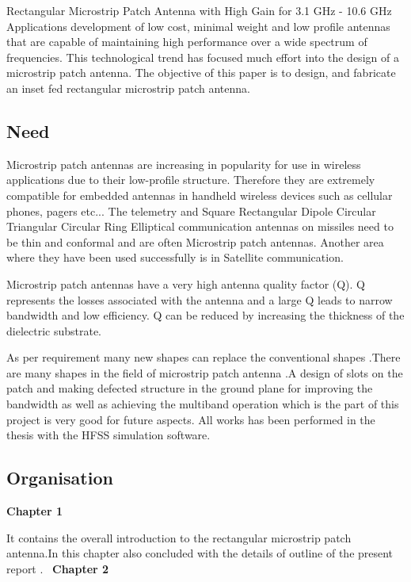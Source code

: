 \documentclass[12pt]{article}
\begin{document}
 \justify
  Rectangular Microstrip Patch Antenna with High Gain for 3.1 GHz - 10.6 GHz Applications development of low cost, minimal weight and low profile antennas that are capable of maintaining high performance over a wide spectrum of frequencies. This technological trend has focused much effort into the design of a microstrip patch antenna. The objective of this paper is to design, and fabricate an inset fed rectangular microstrip patch antenna.

\subsection{Need}\label{sub:Need}
 \justify
   Microstrip patch antennas are increasing in popularity for use in wireless applications due to their low-profile structure. Therefore they are extremely compatible for embedded antennas in handheld wireless devices such as cellular phones, pagers etc... The telemetry and Square Rectangular Dipole Circular Triangular Circular Ring Elliptical communication antennas on missiles need to be thin and conformal and are often Microstrip patch antennas. Another area where they have been used successfully is in Satellite communication.

 \justify
   Microstrip patch antennas have a very high antenna quality factor (Q). Q represents the losses associated with the antenna and a large Q leads to narrow bandwidth and low efficiency. Q can be reduced by increasing the thickness of the dielectric substrate.

 \justify
   As per requirement many new shapes can replace the conventional shapes .There are many shapes in the field of microstrip patch antenna .A design of slots on the patch and making defected structure in the ground plane for improving the bandwidth as well as achieving the multiband operation which is the part of this project is very good for future aspects. All works has been performed in the thesis with the HFSS simulation software.

\cleardoublepage


\subsection{Organisation}\label{sub:Organisation}
 \justify
  \textbf{Chapter 1}

      It contains the overall introduction to the rectangular microstrip patch antenna.In this chapter also concluded with the details of outline of the present report .\
 \justify
  \textbf{Chapter 2}
\end{document}
